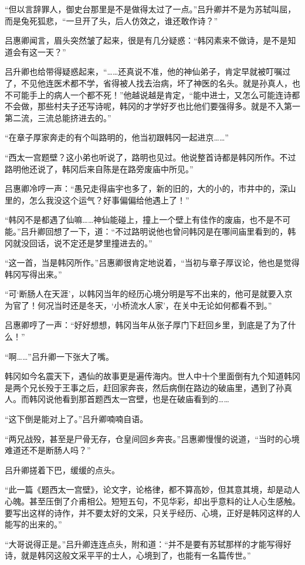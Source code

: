 “但以言辞罪人，御史台那里是不是做得太过了一点。”吕升卿并不是为苏轼叫屈，而是兔死狐悲，“一旦开了头，后人仿效之，谁还敢作诗？”

吕惠卿闻言，眉头突然皱了起来，很是有几分疑惑：“韩冈素来不做诗，是不是知道会有这一天？”

吕升卿也给带得疑惑起来，“……还真说不准，他的神仙弟子，肯定早就被叮嘱过了，不见他连医术都不学，省得被人找去治病，坏了神医的名头。就是孙真人，也不可能手上的病人一个都不死！”他越说越是肯定，“能中进士，又怎么可能连诗都不会做，那些村夫子还写诗呢，韩冈的才学好歹也比他们要强得多。就是不入第一第二流，三流总能挤进去的。”

“在章子厚家奔走的有个叫路明的，他当初跟韩冈一起进京……”

“西太一宫题壁？这小弟也听说了，路明也见过。他说整首诗都是韩冈所作。不过路明他还说了，韩冈后来自陈是在路旁废庙中所见。”

吕惠卿冷哼一声：“愚兄走得庙宇也多了，新的旧的，大的小的，市井中的，深山里的，怎么我没这个运气？好事偏偏给他遇上了！”

“韩冈不是都遇了仙嘛……神仙能碰上，撞上一个壁上有佳作的废庙，也不是不可能。”吕升卿回想了一下，道：“不过路明说他也曾问韩冈是在哪间庙里看到的，韩冈就没回话，说不定还是梦里撞进去的。”

“这一首，当是韩冈所作。”吕惠卿很肯定地说着，“当初与章子厚议论，他也是觉得韩冈写得出来。”

“可‘断肠人在天涯’，以韩冈当年的经历心境分明是写不出来的，他可是就要入京为官了！何况当时还是冬天，‘小桥流水人家’，在关中无论如何都看不到。”

吕惠卿哼了一声：“好好想想，韩冈当年从张子厚门下赶回乡里，到底是了为了什么！”

“啊……”吕升卿一下张大了嘴。

韩冈如今名震天下，遇仙的故事更是遍传海内。世人中十个里面倒有九个知道韩冈是两个兄长殁于王事之后，赶回家奔丧，然后病倒在路边的破庙里，遇到了孙真人。而韩冈说他看到那首题西太一宫壁，也是在破庙看到的……

“这下倒是能对上了。”吕升卿喃喃自语。

“两兄战殁，甚至是尸骨无存，仓皇间回乡奔丧。”吕惠卿慢慢的说道，“当时的心境难道还不是断肠人吗？”

吕升卿搓着下巴，缓缓的点头。

“此一篇《题西太一宫壁》，论文字，论格律，都不算高妙，但其意其境，却是动人心魄。甚至压倒了介甫相公。短短五句，不见华彩，却出乎意料的让人心生感触。要写出这样的诗作，并不要太好的文采，只关乎经历、心境，正好是韩冈这样的人能写的出来的。”

“大哥说得正是。”吕升卿连连点头，附和道：“并不是要有苏轼那样的才能写得好诗，就是韩冈这般文采平平的士人，心境到了，也能有一名篇传世。”

